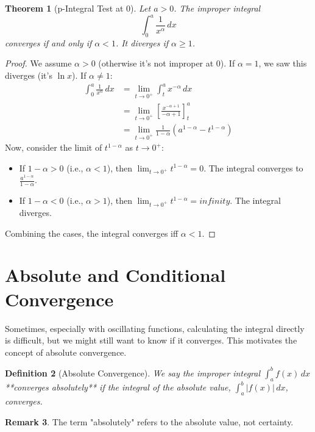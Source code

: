 \documentclass[11pt]{article}
\def\infty{infinity}%
\newtheorem{theorem}{Theorem}[section]
\newtheorem{definition}[theorem]{Definition}
\theoremstyle{definition}
\newtheorem{remark}[theorem]{Remark}
\newcommand{\dx}{\, dx} %
\begin{document}
\begin{theorem}[p-Integral Test at 0]
    Let $a > 0$. The improper integral
    \[
    \int_0^a \frac{1}{x^\alpha} \dx
    \]
    converges if and only if $\alpha < 1$. It diverges if $\alpha \ge 1$.
\end{theorem}
\begin{proof}
    We assume $\alpha > 0$ (otherwise it's not improper at 0).
    If $\alpha = 1$, we saw this diverges (it's $\ln x$).
    If $\alpha \neq 1$:
    \begin{align*} \int_0^a \frac{1}{x^\alpha} \dx &= \lim_{t \to 0^+} \int_t^a x^{-\alpha} \dx \\ &= \lim_{t \to 0^+} \left[ \frac{x^{-\alpha+1}}{-\alpha+1} \right]_t^a \\ &= \lim_{t \to 0^+} \frac{1}{1-\alpha} \left( a^{1-\alpha} - t^{1-\alpha} \right) \end{align*}
    Now, consider the limit of $t^{1-\alpha}$ as $t \to 0^+$:
    \begin{itemize}
        \item If $1-\alpha > 0$ (i.e., $\alpha < 1$), then $\lim_{t \to 0^+} t^{1-\alpha} = 0$. The integral converges to $\frac{a^{1-\alpha}}{1-\alpha}$.
        \item If $1-\alpha < 0$ (i.e., $\alpha > 1$), then $\lim_{t \to 0^+} t^{1-\alpha} = \infty$. The integral diverges.
    \end{itemize}
    Combining the cases, the integral converges iff $\alpha < 1$.
\end{proof}

\section{Absolute and Conditional Convergence}

Sometimes, especially with oscillating functions, calculating the integral directly is difficult, but we might still want to know if it converges. This motivates the concept of absolute convergence.

\begin{definition}[Absolute Convergence]
    We say the improper integral $\int_a^b f(x) \dx$ **converges absolutely** if the integral of the absolute value, $\int_a^b |f(x)| \dx$, converges.
\end{definition}

\begin{remark}
    The term "absolutely" refers to the absolute value, not certainty.
\end{remark}
\end{document}
